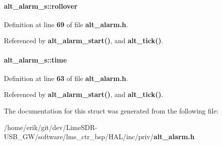 \paragraph[{rollover}]{ alt\+\_\+alarm\+\_\+s\+::rollover}\label{structalt__alarm__s_ae74c24d4ae2db4391df85c7b2156d845}


Definition at line {\bf 69} of file {\bf alt\+\_\+alarm.\+h}.



Referenced by {\bf alt\+\_\+alarm\+\_\+start()}, and {\bf alt\+\_\+tick()}.

\paragraph[{time}]{ alt\+\_\+alarm\+\_\+s\+::time}\label{structalt__alarm__s_ab877122a5e1320d3a46b453d74d9880c}


Definition at line {\bf 63} of file {\bf alt\+\_\+alarm.\+h}.



Referenced by {\bf alt\+\_\+alarm\+\_\+start()}, and {\bf alt\+\_\+tick()}.



The documentation for this struct was generated from the following file\+:\begin{DoxyCompactItemize}
\item 
/home/erik/git/dev/\+Lime\+S\+D\+R-\/\+U\+S\+B\+\_\+\+G\+W/software/lms\+\_\+ctr\+\_\+bsp/\+H\+A\+L/inc/priv/{\bf alt\+\_\+alarm.\+h}\end{DoxyCompactItemize}
